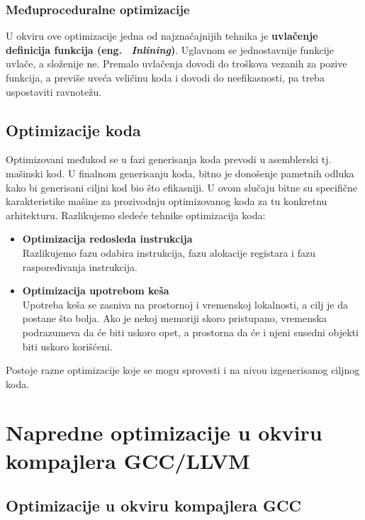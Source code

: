 \documentclass[a4paper]{article}
\begin{document}
\subsubsection{Međuproceduralne optimizacije}
\label{subsubsec:međuproceduralne} 
U okviru ove optimizacije jedna od najznačajnijih tehnika je \textbf{uvlačenje definicija funkcija (eng. ~{\em Inlining})}. 
Uglavnom se jednostavnije funkcije uvlače, a složenije ne. 
Premalo uvlačenja dovodi do troškova vezanih za pozive funkcija, a previše uveća veličinu koda i dovodi do neefikasnosti, pa treba uspostaviti ravnotežu. \cite{kkFM}


\subsection{Optimizacije koda}
\label{subsec:optimizacija_kod}
Optimizovani međukod se u fazi generisanja koda prevodi u asemblerski tj. mašinski kod. 
U finalnom generisanju koda, bitno je donošenje pametnih odluka kako bi generisani ciljni kod bio što efikasniji. 
U ovom slučaju bitne su specifične karakteristike mašine za prozivodnju optimizovanog koda za tu konkretnu arhitekturu. 
Razlikujemo sledeće tehnike optimizacija koda:
\begin{itemize}
  \item \textbf{Optimizacija redosleda instrukcija} \\
  Razlikujemo fazu odabira instrukcija, fazu alokacije registara i fazu raspoređivanja instrukcija.
  \item \textbf{Optimizacija upotrebom keša} \\
  Upotreba keša se zasniva na prostornoj i vremenskoj lokalnosti, a cilj je da postane što bolja.
  Ako je nekoj memoriji skoro pristupano, vremenska podrazumeva da će biti uskoro opet, a prostorna da će i njeni susedni objekti biti uskoro korišćeni.
 
\end{itemize} 
Postoje razne optimizacije koje se mogu sprovesti i na nivou izgenerisanog ciljnog koda. \cite{kkMVJ}


\section{Napredne optimizacije u okviru kompajlera GCC/LLVM}
\label{sec:napredneOptimizacije}

\subsection{Optimizacije u okviru kompajlera GCC}
\label{subsec:optimizacijeGCC}
\end{document}
